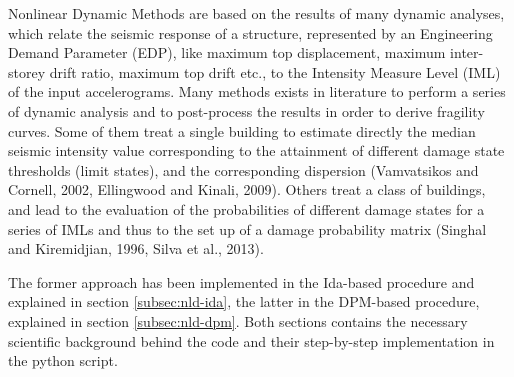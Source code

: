 Nonlinear Dynamic Methods are based on the results of many dynamic analyses, which relate the seismic response of a structure, represented by an Engineering Demand Parameter (EDP), like maximum top displacement, maximum inter-storey drift ratio, maximum top drift etc., to the Intensity Measure Level (IML) of the input accelerograms. 
Many methods exists in literature to perform a series of dynamic analysis and to post-process the results in order to derive fragility curves. Some of them treat a single building to estimate directly the median seismic intensity value corresponding to the attainment of different damage state thresholds (limit states), and the corresponding dispersion (Vamvatsikos and Cornell, 2002, Ellingwood and Kinali, 2009). Others treat a class of buildings, and lead to the evaluation of the probabilities of different damage states for a series of IMLs and thus to the set up of a damage probability matrix (Singhal and Kiremidjian, 1996, Silva et al., 2013).

The former approach has been implemented in the Ida-based procedure and explained in section \ref{subsec:nld-ida}, the latter in the DPM-based procedure, explained in section \ref{subsec:nld-dpm}. Both sections contains the necessary scientific background behind the code and their step-by-step implementation in the python script.